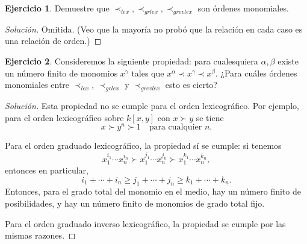 \documentclass{article}
\theoremstyle{definition}
\newtheorem{ejerc}{Ejercicio}
\newenvironment{solucion}{\begin{proof}[Solución]}{\end{proof}}
\begin{document}
\begin{ejerc}
  Demuestre que $\prec_{lex}, \prec_{grlex}, \prec_{grevlex}$ son órdenes
  monomiales.

  \ifdefined\solutions\begin{solucion}
    Omitida. (Veo que la mayoría no probó que la relación en cada caso es una
    relación de orden.)
  \end{solucion}\fi
\end{ejerc}

\begin{ejerc}
  Consideremos la siguiente propiedad: para cualesquiera $\alpha,\beta$ existe
  un número finito de monomios $x^\gamma$ tales que
  $x^\alpha \prec x^\gamma \prec x^\beta$.  ¿Para cuáles órdenes monomiales
  entre $\prec_{lex}$, $\prec_{grlex}$ y $\prec_{grevlex}$ esto es cierto?

  \ifdefined\solutions\begin{solucion}
    Esta propiedad no se cumple para el orden lexicográfico. Por ejemplo, para
    el orden lexicográfico sobre $k [x,y]$ con $x \succ y$ se tiene
    $$x \succ y^n \succ 1 \quad \text{para cualquier }n.$$

    Para el orden graduado lexicográfico, la propiedad sí se cumple: si tenemos
    $$x_1^{i_1}\cdots x_n^{i_n} \succ x_1^{j_1}\cdots x_n^{j_n} \succ x_1^{k_1}\cdots x_n^{k_n},$$
    entonces en particular,
    $$i_1+\cdots+i_n \ge j_1+\cdots+j_n \ge k_1+\cdots+k_n.$$
    Entonces, para el grado total del monomio en el medio, hay un número finito
    de posibilidades, y hay un número finito de monomios de grado total fijo.

    Para el orden graduado inverso lexicográfico, la propiedad se cumple por las
    mismas razones.
  \end{solucion}\fi
\end{ejerc}
\end{document}
